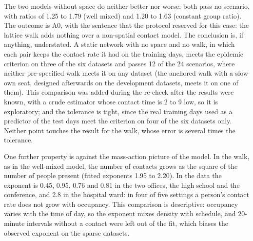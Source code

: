 The two models without space do neither better nor worse: both pass no scenario, with ratios of 1.25 to 1.79
(well mixed) and 1.20 to 1.63 (constant group ratio). The outcome is A0, with the sentence that the protocol
reserved for this case: the lattice walk adds nothing over a non-spatial contact model. The conclusion is, if
anything, understated. A static network with no space and no walk, in which each pair keeps the contact rate
it had on the training days, meets the epidemic criterion on three of the six datasets and passes 12 of the 24
scenarios, where neither pre-specified walk meets it on any dataset (the anchored walk with a slow own seat,
designed afterwards on the development datasets, meets it on one of them). This comparison was added during the
re-check after the results were known, with a crude estimator whose contact time is 2 to 9\pct{} low, so it is exploratory; and the
tolerance is tight, since the real training days used as a predictor of the test days meet the criterion on
four of the six datasets only. Neither point touches the result for the walk, whose error is several times
the tolerance.

One further property is against the mass-action picture of the model. In the walk, as in the well-mixed
model, the number of contacts grows as the square of the number of people present (fitted exponents 1.95 to
2.20). In the data the exponent is 0.45, 0.95, 0.76 and 0.81 in the two offices, the high school and the
conference, and 2.8 in the hospital ward: in four of five settings a person's contact rate does not grow
with occupancy. This comparison is descriptive: occupancy varies with the time of day, so the exponent
mixes density with schedule, and 20-minute intervals without a contact were left out of the fit, which biases
the observed exponent on the sparse datasets.

